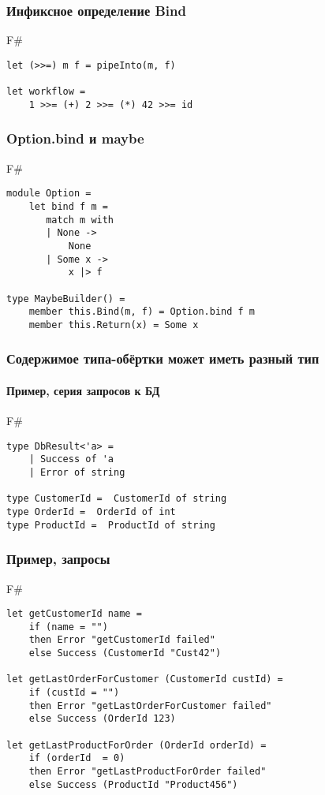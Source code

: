\documentclass[xetex,mathserif,serif]{beamer}
\begin{document}
	\begin{frame}[fragile]
		\frametitle{Инфиксное определение Bind}
		\begin{exampleblock}{F\#}
			\begin{verbatim}
let (>>=) m f = pipeInto(m, f)

let workflow = 
    1 >>= (+) 2 >>= (*) 42 >>= id
			\end{verbatim}
		\end{exampleblock}
\end{frame}

	\begin{frame}[fragile]
		\frametitle{Option.bind и maybe}
		\begin{exampleblock}{F\#}
			\begin{verbatim}
module Option = 
    let bind f m =
       match m with
       | None -> 
           None
       | Some x -> 
           x |> f 

type MaybeBuilder() =
    member this.Bind(m, f) = Option.bind f m
    member this.Return(x) = Some x
			\end{verbatim}
		\end{exampleblock}
\end{frame}

	\begin{frame}[fragile]
		\frametitle{Содержимое типа-обёртки может иметь разный тип}
		\framesubtitle{Пример, серия запросов к БД}
		\begin{exampleblock}{F\#}
			\begin{verbatim}
type DbResult<'a> = 
    | Success of 'a
    | Error of string

type CustomerId =  CustomerId of string
type OrderId =  OrderId of int
type ProductId =  ProductId of string
			\end{verbatim}
		\end{exampleblock}
\end{frame}

	\begin{frame}[fragile]
		\frametitle{Пример, запросы}
		\begin{exampleblock}{F\#}
			\begin{verbatim}
let getCustomerId name =
    if (name = "") 
    then Error "getCustomerId failed"
    else Success (CustomerId "Cust42")

let getLastOrderForCustomer (CustomerId custId) =
    if (custId = "") 
    then Error "getLastOrderForCustomer failed"
    else Success (OrderId 123)

let getLastProductForOrder (OrderId orderId) =
    if (orderId  = 0) 
    then Error "getLastProductForOrder failed"
    else Success (ProductId "Product456")
			\end{verbatim}
		\end{exampleblock}
\end{frame}
\end{document}
